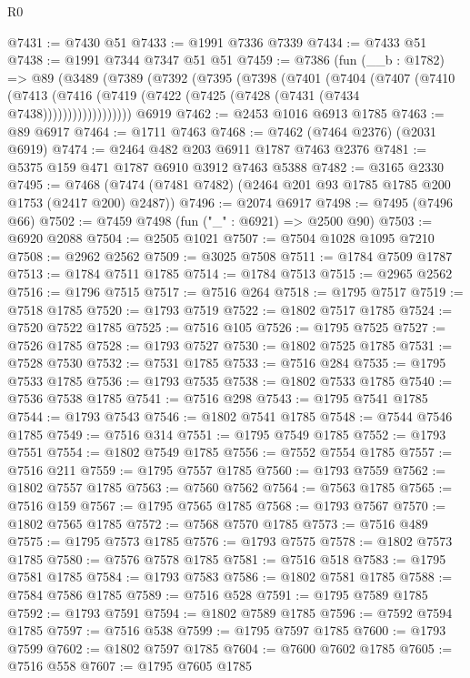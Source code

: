 \begin{lexlean}{R0}
\begin{coremodule}
@7431 := @7430 @51
@7433 := @1991 @7336 @7339
@7434 := @7433 @51
@7438 := @1991 @7344 @7347 @51 @51
@7459 := @7386
    (fun (__b : @1782) =>
    @89
      (@3489
        (@7389
          (@7392
            (@7395
              (@7398
                (@7401
                  (@7404
                    (@7407
                      (@7410
                        (@7413
                          (@7416 (@7419 (@7422 (@7425 (@7428 (@7431 (@7434 @7438))))))))))))))))))
    @6919
@7462 := @2453 @1016 @6913 @1785
@7463 := @89 @6917
@7464 := @1711 @7463
@7468 := @7462 (@7464 @2376) (@2031 @6919)
@7474 := @2464 @482 @203 @6911 @1787 @7463 @2376
@7481 := @5375 @159 @471 @1787 @6910 @3912 @7463 @5388
@7482 := @3165 @2330
@7495 := @7468 (@7474 (@7481 @7482) (@2464 @201 @93 @1785 @1785 @200 @1753 (@2417 @200) @2487))
@7496 := @2074 @6917
@7498 := @7495 (@7496 @66)
@7502 := @7459 @7498 (fun ("_" : @6921) => @2500 @90)
@7503 := @6920 @2088
@7504 := @2505 @1021
@7507 := @7504 @1028 @1095 @7210
@7508 := @2962 @2562
@7509 := @3025 @7508
@7511 := @1784 @7509 @1787
@7513 := @1784 @7511 @1785
@7514 := @1784 @7513
@7515 := @2965 @2562
@7516 := @1796 @7515
@7517 := @7516 @264
@7518 := @1795 @7517
@7519 := @7518 @1785
@7520 := @1793 @7519
@7522 := @1802 @7517 @1785
@7524 := @7520 @7522 @1785
@7525 := @7516 @105
@7526 := @1795 @7525
@7527 := @7526 @1785
@7528 := @1793 @7527
@7530 := @1802 @7525 @1785
@7531 := @7528 @7530
@7532 := @7531 @1785
@7533 := @7516 @284
@7535 := @1795 @7533 @1785
@7536 := @1793 @7535
@7538 := @1802 @7533 @1785
@7540 := @7536 @7538 @1785
@7541 := @7516 @298
@7543 := @1795 @7541 @1785
@7544 := @1793 @7543
@7546 := @1802 @7541 @1785
@7548 := @7544 @7546 @1785
@7549 := @7516 @314
@7551 := @1795 @7549 @1785
@7552 := @1793 @7551
@7554 := @1802 @7549 @1785
@7556 := @7552 @7554 @1785
@7557 := @7516 @211
@7559 := @1795 @7557 @1785
@7560 := @1793 @7559
@7562 := @1802 @7557 @1785
@7563 := @7560 @7562
@7564 := @7563 @1785
@7565 := @7516 @159
@7567 := @1795 @7565 @1785
@7568 := @1793 @7567
@7570 := @1802 @7565 @1785
@7572 := @7568 @7570 @1785
@7573 := @7516 @489
@7575 := @1795 @7573 @1785
@7576 := @1793 @7575
@7578 := @1802 @7573 @1785
@7580 := @7576 @7578 @1785
@7581 := @7516 @518
@7583 := @1795 @7581 @1785
@7584 := @1793 @7583
@7586 := @1802 @7581 @1785
@7588 := @7584 @7586 @1785
@7589 := @7516 @528
@7591 := @1795 @7589 @1785
@7592 := @1793 @7591
@7594 := @1802 @7589 @1785
@7596 := @7592 @7594 @1785
@7597 := @7516 @538
@7599 := @1795 @7597 @1785
@7600 := @1793 @7599
@7602 := @1802 @7597 @1785
@7604 := @7600 @7602 @1785
@7605 := @7516 @558
@7607 := @1795 @7605 @1785

\end{coremodule}
\end{lexlean}

